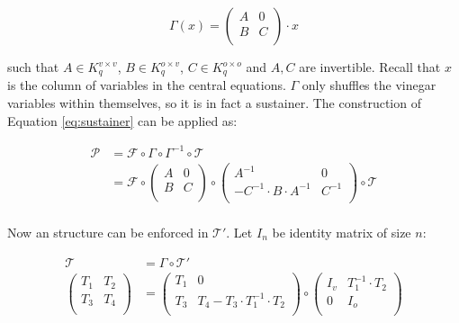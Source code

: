 \documentclass{ufsctex/ufsctex}
\begin{document}
\begin{equation}
\Gamma(x) =
\begin{pmatrix}
A & 0 \\
B & C \\
\end{pmatrix} \cdot x
\end{equation}

such that $A \in K^{v \times v}_q$, $B \in K^{o \times v}_q$, $C \in K^{o
\times o}_q$ and $A, C$ are invertible. Recall that $x$ is the column of
variables in the central equations. $\Gamma$ only shuffles the vinegar
variables within themselves, so it is in fact a sustainer. The construction of
Equation \ref{eq:sustainer} can be applied as:

\begin{equation}
\begin{split}
\mathcal{P} &= \mathcal{F} \circ \Gamma \circ \Gamma^{-1} \circ \mathcal{T} \\
&=
\mathcal{F} \circ
\begin{pmatrix}
A & 0 \\
B & C \\
\end{pmatrix}
\circ
\begin{pmatrix}
A^{-1} & 0 \\
-C^{-1} \cdot B \cdot A^{-1} & C^{-1} \\
\end{pmatrix}
\circ
\mathcal{T} \\
\end{split}
\end{equation}

Now an structure can be enforced in $\mathcal{T'}$. Let $I_n$ be identity
matrix of size $n$:

\begin{equation}
\begin{split}
\mathcal{T} &= \Gamma \circ \mathcal{T'} \\
\begin{pmatrix}
T_1 & T_2 \\
T_3 & T_4 \\
\end{pmatrix}
&=
\begin{pmatrix}
T_1 & 0 \\
T_3 & T_4 - T_3 \cdot T_1^{-1} \cdot T_2 \\
\end{pmatrix}
\circ
\begin{pmatrix}
I_v & T_1^{-1} \cdot T_2 \\
0 & I_o \\
\end{pmatrix} \\
\end{split}
\end{equation}
\end{document}
